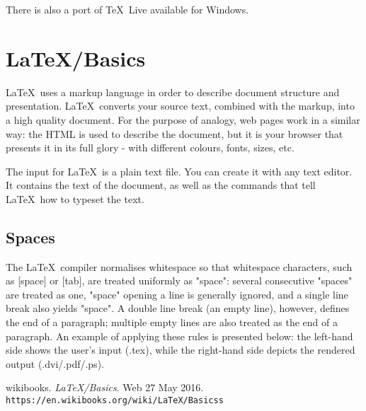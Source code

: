 \documentclass[11pt]{article}
\begin{document}
There is also a port of \TeX\ Live available for Windows.


\section{\LaTeX/Basics}

\LaTeX\ uses a markup language in order to describe document structure and presentation. \LaTeX\ converts your source text, combined with the markup, into a high quality document. For the purpose of analogy, web pages work in a similar way: the HTML is used to describe the document, but it is your browser that presents it in its full glory - with different colours, fonts, sizes, etc.

The input for \LaTeX\ is a plain text file. You can create it with any text editor. It contains the text of the document, as well as the commands that tell \LaTeX\ how to typeset the text.

\subsection{Spaces}

The \LaTeX\ compiler normalises whitespace so that whitespace characters, such as [space] or [tab], are treated uniformly as "space": several consecutive "spaces" are treated as one, "space" opening a line is generally ignored, and a single line break also yields "space". A double line break (an empty line), however, defines the end of a paragraph; multiple empty lines are also treated as the end of a paragraph. An example of applying these rules is presented below: the left-hand side shows the user's input (.tex), while the right-hand side depicts the rendered output (.dvi/.pdf/.ps).

\pagebreak

\begin{thebibliography}{}

wikibooks.
\textit{LaTeX/Basics}.
Web 27 May 2016.
\texttt{https://en.wikibooks.org/wiki/LaTeX/Basicss}


\end{thebibliography}
\end{document}
